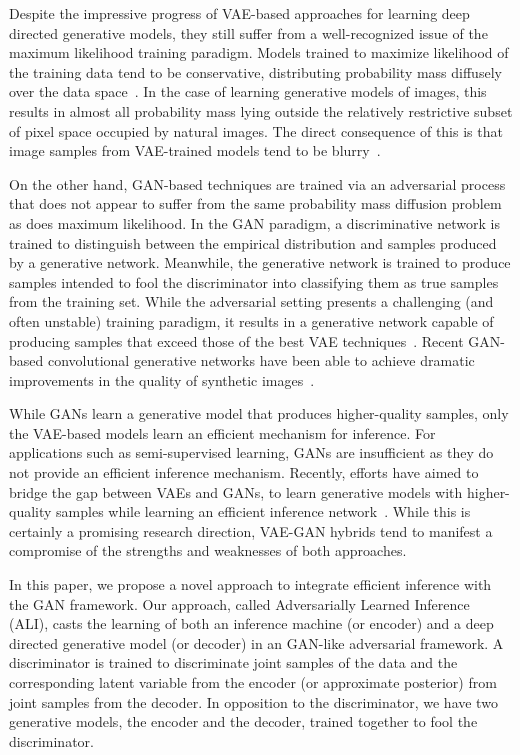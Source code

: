 \documentclass{article}
\begin{document}
Despite the impressive progress of VAE-based approaches for learning deep
directed generative models, they still suffer from a well-recognized issue of
the maximum likelihood training paradigm. Models trained to maximize likelihood
of the training data tend to be conservative, distributing probability mass
diffusely over the data space~\citep{Theis2015}. In the case of learning
generative models of images, this results in almost all probability mass lying
outside the relatively restrictive subset of pixel space occupied by natural
images. The direct consequence of this is that image samples from VAE-trained
models tend to be
blurry~\citep{goodfellow2014generative,larsen2015autoencoding}.

On the other hand, GAN-based techniques are trained via an adversarial process
that does not appear to suffer from the same probability mass diffusion problem
as does maximum likelihood. In the GAN paradigm, a discriminative network is
trained to distinguish between the empirical distribution and samples produced
by a generative network. Meanwhile, the generative network is trained to
produce samples intended to fool the discriminator into classifying them as
true samples from the training set.  While the adversarial setting presents a
challenging (and often unstable) training paradigm, it results in a generative
network capable of producing samples that exceed those of the best VAE
techniques~\citep{radford2015unsupervised,larsen2015autoencoding}. Recent
GAN-based convolutional generative networks have been able to achieve dramatic
improvements in the quality of synthetic
images~\citep{radford2015unsupervised,denton2015deep}.

While GANs learn a generative model that produces higher-quality samples, only
the VAE-based models learn an efficient mechanism for inference. For
applications such as semi-supervised learning, GANs are insufficient as they do
not provide an efficient inference mechanism.  Recently, efforts have aimed to
bridge the gap between VAEs and GANs, to learn generative models with
higher-quality samples while learning an efficient inference
network~\citep{larsen2015autoencoding,lamb2016discriminative,
dosovitskiy2016generating}. While this is certainly a promising research
direction, VAE-GAN hybrids tend to manifest a compromise of the strengths and
weaknesses of both approaches.

In this paper, we propose a novel approach  to integrate efficient inference
with the GAN framework. Our approach, called Adversarially Learned Inference
(ALI), casts the learning of both an inference machine (or encoder) and a deep
directed generative model (or decoder) in an GAN-like adversarial framework. A
discriminator is trained to discriminate joint samples of the data and the
corresponding latent variable from the encoder (or approximate posterior) from
joint samples from the decoder. In opposition to the discriminator, we have two
generative models, the encoder and the decoder, trained together to fool the
discriminator.
\end{document}
